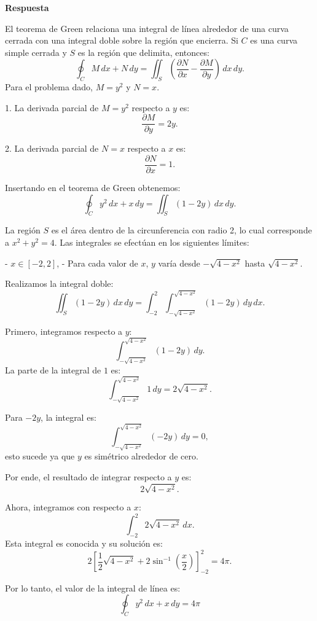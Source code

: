 \documentclass{report}
\begin{document}
\textbf{Respuesta}

El teorema de Green relaciona una integral de línea alrededor de una curva cerrada con una integral doble sobre la región que encierra. Si \(C\) es una curva simple cerrada y \(S\) es la región que delimita, entonces:
\[
\oint_C M \, dx + N \, dy = \iint_S \left( \frac{\partial N}{\partial x} - \frac{\partial M}{\partial y} \right) \, dx \, dy.
\]
Para el problema dado, \(M = y^2\) y \(N = x\).



1. La derivada parcial de \(M = y^2\) respecto a \(y\) es:
\[
\frac{\partial M}{\partial y} = 2y.
\]

2. La derivada parcial de \(N = x\) respecto a \(x\) es:
\[
\frac{\partial N}{\partial x} = 1.
\]



Insertando en el teorema de Green obtenemos:
\[
\oint_C y^2 \, dx + x \, dy = \iint_S \left( 1 - 2y \right) \, dx \, dy.
\]



La región \(S\) es el área dentro de la circunferencia con radio 2, lo cual corresponde a \(x^2 + y^2 = 4\). Las integrales se efectúan en los siguientes límites:

- \(x \in [-2, 2]\),
- Para cada valor de \(x\), \(y\) varía desde \(-\sqrt{4 - x^2}\) hasta \(\sqrt{4 - x^2}\).



Realizamos la integral doble:
\[
\iint_S (1 - 2y) \, dx \, dy = \int_{-2}^2 \int_{-\sqrt{4 - x^2}}^{\sqrt{4 - x^2}} (1 - 2y) \, dy \, dx.
\]

Primero, integramos respecto a \(y\):
\[
\int_{-\sqrt{4 - x^2}}^{\sqrt{4 - x^2}} (1 - 2y) \, dy.
\]
La parte de la integral de \(1\) es:
\[
\int_{-\sqrt{4 - x^2}}^{\sqrt{4 - x^2}} 1 \, dy = 2\sqrt{4 - x^2}.
\]

Para \(-2y\), la integral es:
\[
\int_{-\sqrt{4 - x^2}}^{\sqrt{4 - x^2}} (-2y) \, dy = 0,
\]
esto sucede ya que \(y\) es simétrico alrededor de cero.

Por ende, el resultado de integrar respecto a \(y\) es:
\[
2\sqrt{4 - x^2}.
\]

Ahora, integramos con respecto a \(x\):
\[
\int_{-2}^2 2\sqrt{4 - x^2} \, dx.
\]
Esta integral es conocida y su solución es:
\[
2 \left[ \frac{1}{2} \sqrt{4 - x^2} + 2 \sin^{-1}\left(\frac{x}{2}\right) \right]_{-2}^2 = 4\pi.
\]



Por lo tanto, el valor de la integral de línea es:
\[
{\oint_C y^2 \, dx + x \, dy = 4\pi}
\]
\newpage
\end{document}
